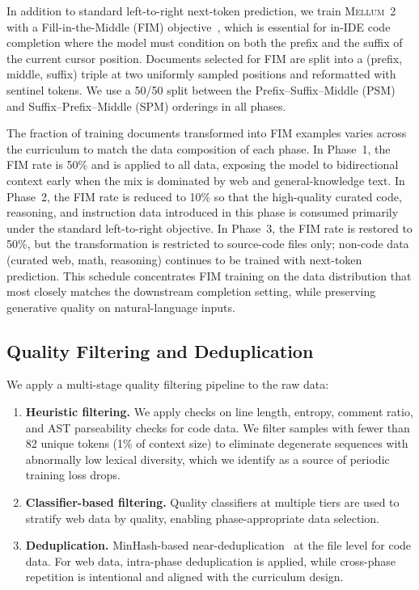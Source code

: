 \documentclass[11pt,a4paper]{article}
\newcommand{\modelname}{\textsc{Mellum~2}\xspace}
\begin{document}
In addition to standard left-to-right next-token prediction, we train
\modelname with a Fill-in-the-Middle (FIM) objective~\cite{bavarian2022fim},
which is essential for in-IDE code completion where the model must condition
on both the prefix and the suffix of the current cursor position. Documents
selected for FIM are split into a (prefix, middle, suffix) triple at two
uniformly sampled positions and reformatted with sentinel tokens. We use a
50/50 split between the Prefix--Suffix--Middle (PSM) and
Suffix--Prefix--Middle (SPM) orderings in all phases.

The fraction of training documents transformed into FIM examples varies
across the curriculum to match the data composition of each phase. In
Phase~1, the FIM rate is 50\% and is applied to all data, exposing the
model to bidirectional context early when the mix is dominated by web and
general-knowledge text. In Phase~2, the FIM rate is reduced to 10\% so
that the high-quality curated code, reasoning, and instruction data
introduced in this phase is consumed primarily under the standard
left-to-right objective. In Phase~3, the FIM rate is restored to 50\%, but
the transformation is restricted to source-code files only; non-code data
(curated web, math, reasoning) continues to be trained with next-token
prediction. This schedule concentrates FIM training on the data
distribution that most closely matches the downstream completion setting,
while preserving generative quality on natural-language inputs.

\subsection{Quality Filtering and Deduplication}

We apply a multi-stage quality filtering pipeline to the raw data:

\begin{enumerate}
  \item \textbf{Heuristic filtering.} We apply checks on line length, entropy, comment ratio,
    and AST parseability checks for code data. We filter samples with fewer
    than 82 unique tokens (1\% of context size) to eliminate degenerate
    sequences with abnormally low lexical diversity, which we identify
    as a source of periodic training loss drops.
  \item \textbf{Classifier-based filtering.} Quality classifiers at multiple
    tiers are used to stratify web data by quality, enabling phase-appropriate
    data selection.
  \item \textbf{Deduplication.} MinHash-based near-deduplication~\cite{lee2022deduplicating} at the file
    level for code data. For web data, intra-phase deduplication is applied,
    while cross-phase repetition is intentional and aligned with the curriculum
    design.
\end{enumerate}
\end{document}
